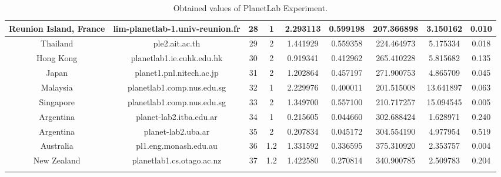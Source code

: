 \begin{center}
{\begin{longtable}{c c c c c c c c c}
        Reunion Island, France & lim-planetlab-1.univ-reunion.fr & 28 & 1  &2.293113&0.599198&207.366898&3.150162&0.010\\\hline
        Thailand & ple2.ait.ac.th                       & 29  &  2 &1.441929&0.559358&224.464973&5.175334&0.018\\\hline
        Hong Kong & planetlab1.ie.cuhk.edu.hk           & 30  &  2 &0.919341&0.412962&265.410228&5.815682&0.135\\\hline
        Japan & planet1.pnl.nitech.ac.jp                & 31  &  2 &1.202864&0.457197&271.900753&4.865709&0.045\\\hline
        Malaysia & planetlab1.comp.nus.edu.sg           & 32  &  1 &2.229976&0.400011&201.515008&13.641897&0.063\\\hline
        Singapore & planetlab1.comp.nus.edu.sg          & 33  &  2 &1.349700&0.557100&210.717257&15.094545&0.005\\\hline
        Argentina & planet-lab2.itba.edu.ar             & 34  &  1 &0.215605&0.044660&302.688424&1.628971&0.240\\\hline
        Argentina  & planet-lab2.uba.ar                 & 35  &  2 &0.207834&0.045172&304.554190&4.977954&0.519\\\hline
        Australia & pl1.eng.monash.edu.au               & 36  &1.2 &1.331592&0.336595&375.310920&2.353757&0.004\\\hline
        New Zealand & planetlab1.cs.otago.ac.nz         & 37  &1.2 &1.422580&0.270814&340.900785&2.509783&0.204\\\hline
\caption{Obtained values of PlanetLab Experiment.}
\label{anex:nodes-pl-results}
\end{longtable}
}
\end{center}
